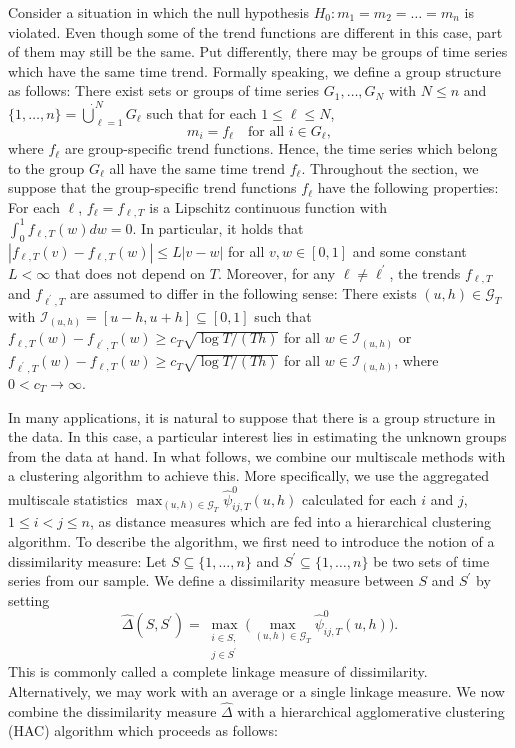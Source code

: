 \documentclass[a4paper,12pt]{article}
\begin{document}
Consider a situation in which the null hypothesis $H_0: m_1 = m_2 = \ldots = m_n$ is violated. Even though some of the trend functions are different in this case, part of them may still be the same. Put differently, there may be groups of time series which have the same time trend. Formally speaking, we define a group structure as follows: There exist sets or groups of time series $G_1,\ldots, G_N$ with $N \le n$ and $\{1,\ldots, n\} = \mathbin{\dot{\bigcup}}_{\ell=1}^{N} G_\ell$ such that for each $1 \le \ell \le N$,
\[ m_i = f_\ell \quad \text{for all } i \in G_\ell, \]
where $f_\ell$ are group-specific trend functions. Hence, the time series which belong to the group $G_\ell$ all have the same time trend $f_\ell$. Throughout the section, we suppose that the group-specific trend functions $f_\ell$ have the following properties: For each $\ell$, $f_\ell = f_{\ell,T}$ is a Lipschitz continuous function with $\int_0^1 f_{\ell,T}(w) dw = 0$. In particular, it holds that $|f_{\ell,T}(v) - f_{\ell,T}(w)| \le L |v-w|$ for all $v, w \in [0,1]$ and some constant $L < \infty$ that does not depend on $T$. Moreover, for any $\ell \ne \ell^\prime$, the trends $f_{\ell,T}$ and $f_{\ell^\prime,T}$ are assumed to differ in the following sense: There exists $(u, h) \in \mathcal{G}_T$ with $\mathcal{I}_{(u, h)} = [u-h, u+h] \subseteq [0,1]$ such that $f_{\ell,T}(w) - f_{\ell^\prime,T}(w) \ge c_T \sqrt{\log T/(Th)}$ for all $w \in \mathcal{I}_{(u, h)}$ or $f_{\ell^\prime,T}(w) - f_{\ell,T}(w) \ge c_T \sqrt{\log T/(Th)}$ for all $w \in \mathcal{I}_{(u, h)}$, where $0 < c_T \rightarrow \infty$.


In many applications, it is natural to suppose that there is a group structure in the data. In this case, a particular interest lies in estimating the unknown groups from the data at hand. In what follows, we combine our multiscale methods with a clustering algorithm to achieve this. {\color{red}More specifically, we use the aggregated multiscale statistics $\max_{(u, h) \in \mathcal{G}_T}\hat{\psi}^0_{ij, T}(u, h)$ calculated for each $i$ and $j$, $1\leq i < j \leq n$,} as distance measures which are fed into a hierarchical clustering algorithm. To describe the algorithm, we first need to introduce the notion of a dissimilarity measure: Let $S \subseteq \{1,\ldots, n\}$ and $S^\prime \subseteq \{1,\ldots, n\}$ be two sets of time series from our sample. We define a dissimilarity measure between $S$ and $S^\prime$ by setting 
{\color{red}\begin{equation}\label{dissimilarity}
\widehat{\Delta}(S,S^\prime) = \max_{\substack{i \in S, \\ j \in S^\prime}} \Big(\max_{(u, h) \in \mathcal{G}_T}\hat{\psi}^0_{ij, T}(u, h)\Big). 
\end{equation}}
This is commonly called a complete linkage measure of dissimilarity. Alternatively, we may work with an average or a single linkage measure. We now combine the dissimilarity measure $\widehat{\Delta}$ with a hierarchical agglomerative clustering (HAC) algorithm which proceeds as follows: 
\vspace{10pt}
\end{document}
